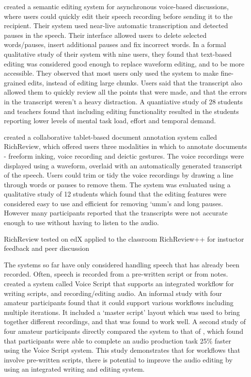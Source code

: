 \citet{Sivaraman2016} created a semantic editing system for asynchronous voice-based discussions, where users could
quickly edit their speech recording before sending it to the recipient.  Their system used near-live automatic
transcription and detected pauses in the speech. Their interface allowed users to delete selected words/pauses, insert
additional pauses and fix incorrect words.  In a formal qualitative study of their system with nine users, they found
that text-based editing was considered good enough to replace waveform editing, and to be more accessible. They
observed that most users only used the system to make fine-grained edits, instead of editing large chunks.  Users said
that the transcript also allowed them to quickly review all the points that were made, and that the errors in the
transcript weren't a heavy distraction. A quantiative study of 28 students and teachers found that
including editing functionality resulted in the students reporting lower levels of mental task load, effort and
temporal demand.

\citet{Yoon2014} created a collaborative tablet-based document annotation system called RichReview, which offered users
three modalities in which to annotate documents - freeform inking, voice recording and deictic gestures. The voice
recordings were displayed using a waveform, overlaid with an automatically generated transcript of the speech.
Users could trim or tidy the voice recordings by drawing a line through words or pauses to remove them.
The system was evaluated using a qualitative study of 12 students which found that the editing features were
considered easy to use and efficient for removing `umm's and long pauses.
However many participants reported that the transcripts were not accurate enough to use without having to listen to
the audio.

RichReview tested on edX \citep{Yoon2015}
applied to the classroom \citep{Yoon2015a}
RichReview++ for instuctor feedback and peer discussion \citep{Yoon2016}

The systems so far have only considered handling speech that has already been recorded. Often, speech is recorded from
a pre-written script or from notes. \citet{Shin2016} created a system called Voice Script that supports an
integrated workflow for writing scripts, and recording/editing audio. An informal study with four amateur participants
found that it could support various workflows including multiple iterations. It included a `master script' layout
which was used to bring together different recordings,  and that was found to work well.  A second study of four
amateur participants directly compared the system to that of \citet{Rubin2013}, which found that participants were able
to complete an audio production task 25\% faster using the Voice Script system.  This study demonstrates that for
workflows that involve pre-written scripts, there is potential to improve the audio editing by using an integrated
writing and editing system.


